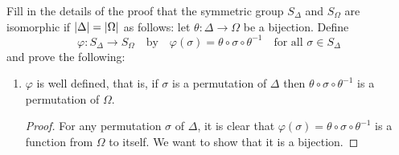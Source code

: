  Fill in the details of the proof that the symmetric
group $S_\Delta$ and $S_\Omega$ are isomorphic if
$\lvert{\Delta}\rvert = \lvert{\Omega}\rvert$ as follows: let
$\theta\colon\Delta\to\Omega$ be a bijection. Define
\begin{equation*}
  \varphi\colon S_\Delta\to S_\Omega
  \quad\text{by}\quad
  \varphi(\sigma) = \theta\circ\sigma\circ\theta^{-1}
  \quad\text{for all $\sigma\in S_\Delta$}
\end{equation*}
and prove the following:
\begin{enumerate}
\item $\varphi$ is well defined, that is, if $\sigma$ is a permutation
  of $\Delta$ then $\theta\circ\sigma\circ\theta^{-1}$ is a
  permutation of $\Omega$.
  \begin{proof}
    For any permutation $\sigma$ of $\Delta$, it is clear that
    $\varphi(\sigma) = \theta\circ\sigma\circ\theta^{-1}$ is a
    function from $\Omega$ to itself. We want to show that it is a
    bijection.


\end{proof}
\end{enumerate}
